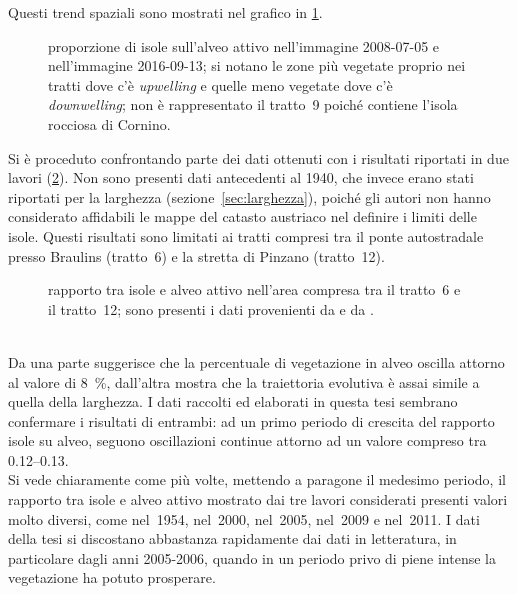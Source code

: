 Questi trend spaziali sono mostrati nel grafico in \cref{graph:rapp-isl-2008-2016}.
%
\begin{figure}
	\centering
	
	\caption[proporzione di isole sull'alveo attivo nel 2008-07-05 e nel 2016-09-13]{proporzione di isole sull'alveo attivo nell'immagine \AST{} 2008-07-05 e nell'immagine \Se{} 2016-09-13; si notano le zone più vegetate proprio nei tratti dove c'è \emph{upwelling} e quelle meno vegetate dove c'è \emph{downwelling}; non è rappresentato il tratto~9 poiché contiene l'isola rocciosa di Cornino.}
	\label{graph:rapp-isl-2008-2016}
\end{figure}
%

Si è proceduto confrontando parte dei dati ottenuti con i risultati riportati in due lavori  (\cref{graph:rapp-isl-vs-letteratura}).
Non sono presenti dati antecedenti al 1940, che invece erano stati riportati per la larghezza (sezione~\ref{sec:larghezza}), poiché gli autori non hanno considerato affidabili le mappe del catasto austriaco nel definire i limiti delle isole.
Questi risultati sono limitati ai tratti compresi tra il ponte autostradale presso Braulins (tratto~6) e la stretta di Pinzano (tratto~12).
%
\begin{figure}
	\centering
	
	\caption[rapporto tra isole e alveo attivo nell'area compresa tra il tratto~6 e il tratto~12]{rapporto tra isole e alveo attivo nell'area compresa tra il tratto~6 e il tratto~12; sono presenti i dati provenienti da  e da .}
	\label{graph:rapp-isl-vs-letteratura}
\end{figure}
%
\\
Da una parte  suggerisce che la percentuale di vegetazione in alveo oscilla attorno al valore di \SI{8}{\percent}, dall'altra  mostra che la traiettoria evolutiva è assai simile a quella della larghezza.
I dati raccolti ed elaborati in questa tesi sembrano confermare i risultati di entrambi: ad un primo periodo di crescita del rapporto isole su alveo, seguono oscillazioni continue attorno ad un valore compreso tra \numrange[range-phrase={ e }]{0.12}{0.13}.
\\
Si vede chiaramente come più volte, mettendo a paragone il medesimo periodo, il rapporto tra isole e alveo attivo mostrato dai tre lavori considerati presenti valori molto diversi, come nel~1954, nel~2000, nel~2005, nel~2009 e nel~2011.
I dati della tesi si discostano abbastanza rapidamente dai dati in letteratura, in particolare dagli anni 2005-2006, quando in un periodo privo di piene intense la vegetazione ha potuto prosperare.
